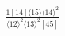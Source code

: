 \documentclass[varwidth, border=5pt]{standalone}
\begin{document}
\begin{my}
$\begin{gathered}
\scriptscriptstyle\frac{1[14]⟨15⟩⟨14⟩^2}{⟨12⟩^2⟨13⟩^2[45]}
\end{gathered}$
\end{my}
\end{document}
